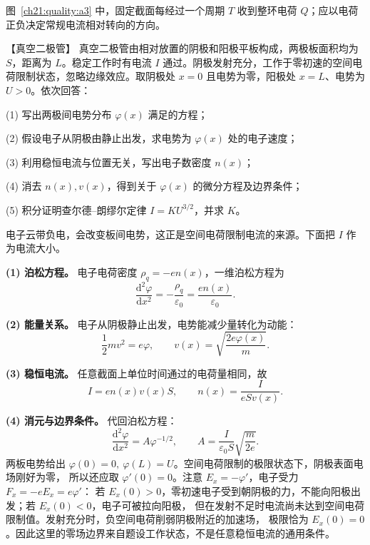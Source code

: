 {\begin{xesolution}
图~\ref{ch21:quality:a3} 中，固定截面每经过一个周期 $T$ 收到整环电荷 $Q$；应以电荷正负决定常规电流相对转向的方向。
\end{xesolution}



\begin{origexamplebox}{【真空二极管】}\label{ch21:ex:s36-5-4}
真空二极管由相对放置的阴极和阳极平板构成，两极板面积均为 $S$，距离为 $L$。稳定工作时有电流
$I$ 通过。阴极发射充分，工作于零初速的空间电荷限制状态，忽略边缘效应。取阴极处 $x=0$ 且电势为零，阳极处 $x=L$、电势为 $U>0$。依次回答：

(1) 写出两极间电势分布 $\varphi(x)$ 满足的方程；

(2) 假设电子从阴极由静止出发，求电势为 $\varphi(x)$ 处的电子速度；

(3) 利用稳恒电流与位置无关，写出电子数密度 $n(x)$；

(4) 消去 $n(x),v(x)$，得到关于 $\varphi(x)$ 的微分方程及边界条件；

(5) 积分证明查尔德--朗缪尔定律 $I=KU^{3/2}$，并求 $K$。
\par\noindent\begin{minipage}{\linewidth}
\vacuumDiodeFigure
{}
\end{minipage}\par\medskip
\end{origexamplebox}\par\nopagebreak[4]


\begin{xesolution}
电子云带负电，会改变板间电势，这正是空间电荷限制电流的来源。下面把 $I$ 作为电流大小。

\textbf{(1) 泊松方程。} 电子电荷密度 $\rho_q=-en(x)$，一维泊松方程为
\[
  \frac{\mathrm d^2\varphi}{\mathrm dx^2}
  =-\frac{\rho_q}{\varepsilon_0}=\frac{en(x)}{\varepsilon_0}.
\]

\textbf{(2) 能量关系。} 电子从阴极静止出发，电势能减少量转化为动能：
\[
  \frac12mv^2=e\varphi,
  \qquad v(x)=\sqrt{\frac{2e\varphi(x)}m}.
\]

\textbf{(3) 稳恒电流。} 任意截面上单位时间通过的电荷量相同，故
\[
  I=en(x)v(x)S,
  \qquad n(x)=\frac{I}{eSv(x)}.
\]

\textbf{(4) 消元与边界条件。} 代回泊松方程：
\[
  \frac{\mathrm d^2\varphi}{\mathrm dx^2}
  =A\varphi^{-1/2},
  \qquad
  A=\frac{I}{\varepsilon_0S}\sqrt{\frac m{2e}}.
\]
两板电势给出 $\varphi(0)=0,\ \varphi(L)=U$。空间电荷限制的极限状态下，阴极表面电场刚好为零，
所以还应取 $\varphi'(0)=0$。注意 $E_x=-\varphi'$，电子受力 $F_x=-eE_x=e\varphi'$：
若 $E_x(0)>0$，零初速电子受到朝阴极的力，不能向阳极出发；若 $E_x(0)<0$，电子可被拉向阳极，
但在发射不足时电流尚未达到空间电荷限制值。发射充分时，负空间电荷削弱阴极附近的加速场，
极限恰为 $E_x(0)=0$。因此这里的零场边界来自题设工作状态，不是任意稳恒电流的通用条件。


\end{xesolution}}
